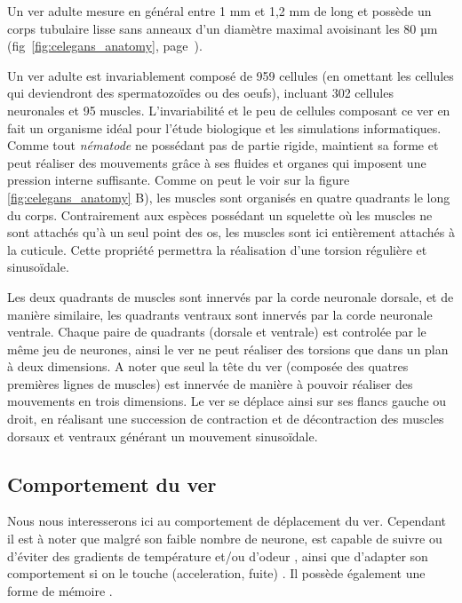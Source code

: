 Un ver \celeg{} adulte mesure en général entre 1 mm et 1,2 mm de long et
possède un corps tubulaire lisse sans anneaux d'un diamètre maximal
avoisinant les 80 µm (fig~\ref{fig:celegans_anatomy},
page~\pageref{fig:celegans_anatomy}).

Un ver adulte est invariablement composé de 959 cellules (en omettant les
cellules qui deviendront des spermatozoïdes ou des oeufs), incluant 302
cellules neuronales et 95 muscles.  \cite{Boyle2009} L'invariabilité et le peu de
cellules composant ce ver en fait un organisme idéal pour l'étude
biologique et les simulations informatiques.\\


Comme tout \textit{nématode} ne possédant pas de partie rigide, \celeg{}
maintient sa forme et peut réaliser des mouvements grâce à ses fluides 
et organes qui imposent une pression interne suffisante. Comme on peut le voir sur la
figure \ref{fig:celegans_anatomy} B), les muscles sont organisés en quatre
quadrants le long du corps. Contrairement aux espèces possédant un
squelette où les muscles ne sont attachés qu'à un seul point des os, les
muscles sont ici entièrement attachés à la cuticule. Cette propriété permettra la réalisation d'une torsion régulière
et sinusoïdale.

Les deux quadrants de muscles sont innervés par la corde neuronale dorsale, et de
manière similaire, les quadrants ventraux sont innervés par la corde neuronale
ventrale. Chaque paire de quadrants (dorsale et ventrale) est controlée par le même
jeu de neurones, ainsi le ver ne peut réaliser des torsions que dans un plan à
deux dimensions. A noter que seul la tête du ver (composée des quatres premières
lignes de muscles) est innervée de manière à pouvoir réaliser des mouvements en trois
dimensions. Le ver se déplace ainsi sur ses flancs gauche ou droit, en réalisant
une succession de contraction et de décontraction des muscles dorsaux et ventraux
générant un mouvement sinusoïdale.


\subsection{Comportement du ver} %
\label{sub:Comportement du ver}

Nous nous interesserons ici au comportement de déplacement du ver. Cependant il est
à noter que malgré son faible nombre de neurone, \celeg{} est capable de
suivre ou d'éviter des gradients de température et/ou d'odeur
\cite{Ferree1999,Gray2005}, ainsi que d'adapter son comportement si on le touche
(acceleration, fuite) \cite{Chalfie1985}. Il possède également une forme de
mémoire \cite{Rankin2005a}.\\

